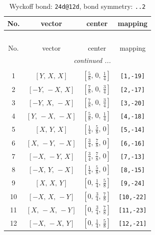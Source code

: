 \documentclass[fleqn,8pt]{jsarticle}
\begin{document}
\begin{longtable}{cccc}
\caption{Wyckoff bond: {\tt 24d@12d}, bond symmetry: {\tt ..2}}
 \\
 \hline \hline
No. & vector & center & mapping \\ \hline \endfirsthead

\multicolumn{3}{l}{\tablename\ \thetable{}} \\
 \hline \hline
No. & vector & center & mapping \\ \hline \endhead

 \hline \hline
\multicolumn{3}{r}{\footnotesize\it continued ...} \\ \endfoot

 \hline \hline
\multicolumn{3}{r}{} \\ \endlastfoot

1 & $\left[ Y,\, X,\, X \right]$ & $\left[ \frac{5}{8},\, 0,\, \frac{1}{4} \right]$ & {\tt [1,-19]} \\ \hline
2 & $\left[ - Y,\, - X,\, X \right]$ & $\left[ \frac{7}{8},\, 0,\, \frac{3}{4} \right]$ & {\tt [2,-17]} \\ \hline
3 & $\left[ - Y,\, X,\, - X \right]$ & $\left[ \frac{7}{8},\, 0,\, \frac{3}{4} \right]$ & {\tt [3,-20]} \\ \hline
4 & $\left[ Y,\, - X,\, - X \right]$ & $\left[ \frac{5}{8},\, 0,\, \frac{1}{4} \right]$ & {\tt [4,-18]} \\ \hline
5 & $\left[ X,\, Y,\, X \right]$ & $\left[ \frac{1}{4},\, \frac{5}{8},\, 0 \right]$ & {\tt [5,-14]} \\ \hline
6 & $\left[ X,\, - Y,\, - X \right]$ & $\left[ \frac{3}{4},\, \frac{7}{8},\, 0 \right]$ & {\tt [6,-16]} \\ \hline
7 & $\left[ - X,\, - Y,\, X \right]$ & $\left[ \frac{3}{4},\, \frac{7}{8},\, 0 \right]$ & {\tt [7,-13]} \\ \hline
8 & $\left[ - X,\, Y,\, - X \right]$ & $\left[ \frac{1}{4},\, \frac{5}{8},\, 0 \right]$ & {\tt [8,-15]} \\ \hline
9 & $\left[ X,\, X,\, Y \right]$ & $\left[ 0,\, \frac{1}{4},\, \frac{5}{8} \right]$ & {\tt [9,-24]} \\ \hline
10 & $\left[ - X,\, X,\, - Y \right]$ & $\left[ 0,\, \frac{3}{4},\, \frac{7}{8} \right]$ & {\tt [10,-22]} \\ \hline
11 & $\left[ X,\, - X,\, - Y \right]$ & $\left[ 0,\, \frac{3}{4},\, \frac{7}{8} \right]$ & {\tt [11,-23]} \\ \hline
12 & $\left[ - X,\, - X,\, Y \right]$ & $\left[ 0,\, \frac{1}{4},\, \frac{5}{8} \right]$ & {\tt [12,-21]} \\
\end{longtable}
\end{document}

